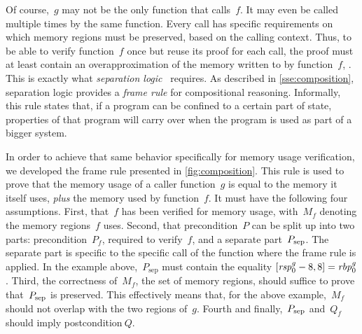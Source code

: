 Of course,~$g$ may not be the only function that calls~$f$.
It may even be called multiple times by the same function.
Every call has specific requirements on which memory regions must be preserved,
based on the calling context.
Thus, to be able to verify function~$f$ once
but reuse its proof for each call,
the proof must at least contain an overapproximation
of the memory written to by function~$f$, .
This is exactly what \emph{separation
logic}~\citep{o2001local,reynolds2002separation,krebbers2017essence}%
requires.
As described in \cref{sse:composition},
separation logic provides a \emph{frame rule} for compositional reasoning.%
Informally, this rule states that, if a program can be confined
to a certain part of state, properties of that program will carry over
when the program is used as part of a bigger system.

In order to achieve that same behavior specifically for memory usage verification,%
we developed the frame rule presented in \cref{fig:composition}.
This rule is used to prove that the memory usage of a caller function~$g$
is equal to the memory it itself uses, \emph{plus} the memory used by function~$f$.
It must have the following four assumptions.
First, that~$f$ has been verified for memory usage,
with~$M_f$ denoting the memory regions~$f$ uses.%
Second, that precondition~$P$ can be split up into two parts:
precondition~$P_f$, required to verify~$f$, and a separate part~$\psep$.
The separate part is specific to the specific call of the function
where the frame rule is applied.%
In the example above,~$P_\mathrm{sep}$ must contain the equality
$\region{\rspo^g-8}{8}=\rbpo^g$.
Third, the correctness of~$M_f$, the set of memory regions,
should suffice to prove that~$\psep$ is preserved.
This effectively means that, for the above example,~$M_f$
should not overlap with the two regions of~$g$.
Fourth and finally,~$\psep$ and~$Q_f$ should imply postcondition$~Q$.
\begin{figure*}
  \begin{prooftree}
  \end{prooftree}
  \caption{Frame rule for composition of memory usage}\label{fig:composition}
\end{figure*}

